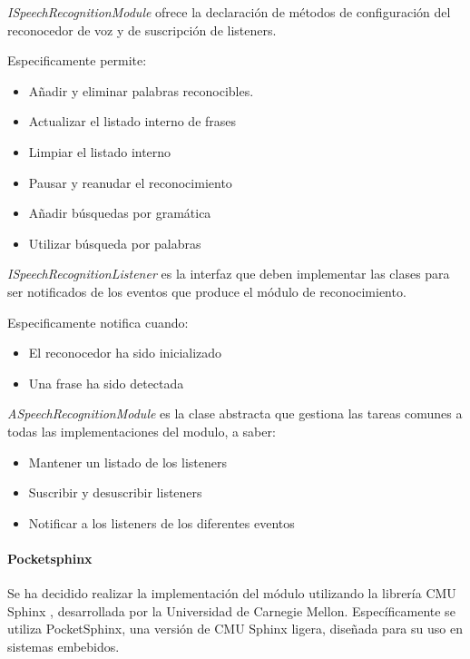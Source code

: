 \textit{ISpeechRecognitionModule} ofrece la declaración de métodos de configuración del reconocedor de  voz y de suscripción de listeners.


Especificamente permite:
\begin{itemize}
 	\item Añadir y eliminar palabras reconocibles.
 	\item Actualizar el listado interno de frases
	\item Limpiar el listado interno
	\item Pausar y reanudar el reconocimiento
	\item Añadir búsquedas por gramática
	\item Utilizar búsqueda por palabras
 	 
\end{itemize}



\textit{ISpeechRecognitionListener} es la interfaz que deben implementar las clases para ser notificados de los eventos que produce el módulo de reconocimiento.

Especificamente notifica cuando:
\begin{itemize}
	\item El reconocedor ha sido inicializado
	\item Una frase ha sido detectada
\end{itemize}

   


\textit{ASpeechRecognitionModule} es la clase abstracta que gestiona las tareas comunes a todas las implementaciones del modulo, a saber:

\begin{itemize}
	\item Mantener un listado de los listeners
	\item Suscribir y desuscribir listeners
	\item Notificar a los listeners de los diferentes eventos
\end{itemize}





\paragraph*{Pocketsphinx\\}


Se ha decidido realizar la implementación del módulo utilizando la librería CMU Sphinx \cite{cmusphinx}, desarrollada por la Universidad de Carnegie Mellon.
Específicamente se utiliza PocketSphinx, una versión de CMU Sphinx ligera, diseñada para su uso en sistemas embebidos.

